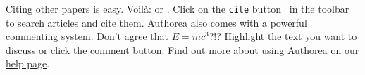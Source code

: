 Citing other papers is easy. Voilà: \cite{2012} or \cite{Holstein_2009}. Click on the \verb|cite| button~\cite{Szpyrka_2013} in the toolbar to search articles and cite them. Authorea also comes with a powerful commenting system. Don't agree that $E  =  mc^{3}$?!? Highlight the text you want to discuss or click the comment button. Find out more about using Authorea on \href{https://www.authorea.com/help}{our help page}.